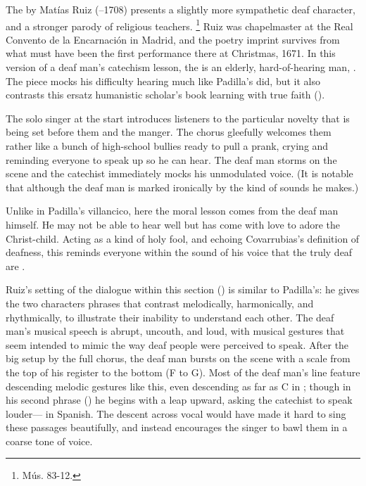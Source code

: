 The  by Matías Ruiz (--1708) presents a slightly more sympathetic deaf character, and a stronger parody of religious teachers.%
  \footnote{\signature{E-E}{Mús. 83-12}.}
Ruiz was chapelmaster at the Real Convento de la Encarnación in Madrid, and the poetry imprint survives from what must have been the first performance there at Christmas, 1671.%
  \autocite{1671-Madrid-Enc-Nav}
In this version of a deaf man's catechism lesson, the  is an elderly, hard-of-hearing man, .
The piece mocks his difficulty hearing much like Padilla's did, but it also contrasts this ersatz humanistic scholar's book learning with true faith ().


The solo singer at the start introduces listeners to the particular novelty that is being set before them and the manger.
The chorus gleefully welcomes them rather like a bunch of high-school bullies ready to pull a prank, crying  and reminding everyone to speak up so he can hear.
The deaf man storms on the scene and the catechist immediately mocks his unmodulated voice.
(It is notable that although the deaf man is marked ironically by the kind of sounds he makes.)

Unlike in Padilla's villancico, here the moral lesson comes from the deaf man himself.
He may not be able to hear well but has come with love to adore the Christ-child. 
Acting as a kind of holy fool, and echoing Covarrubias's definition of deafness, this  reminds everyone within the sound of his voice that the truly deaf are .

Ruiz's setting of the dialogue within this section () is similar to Padilla's: he gives the two characters phrases that contrast melodically, harmonically, and rhythmically, to illustrate their inability to understand each other.
The deaf man's musical speech is abrupt, uncouth, and loud, with musical gestures that seem intended to mimic the way deaf people were perceived to speak.
After the big setup by the full chorus, the deaf man bursts on the scene with a scale from the top of his register to the bottom (F to G).
Most of the deaf man's line feature descending melodic gestures like this, even descending as far as C in ; though in his second phrase () he begins with a leap upward, asking the catechist to speak louder--- in Spanish.
The descent across vocal  would have made it hard to sing these passages beautifully, and instead encourages the singer to bawl them in a coarse tone of voice.

